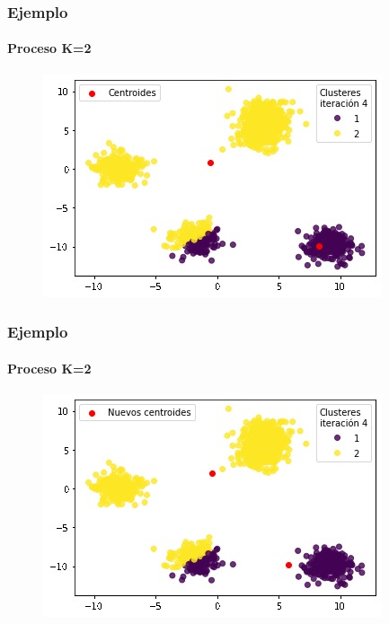 \documentclass[
  shownotes,
  xcolor={svgnames},
  hyperref={colorlinks,citecolor=DarkBlue,linkcolor=DarkRed,urlcolor=DarkBlue}
  , aspectratio=169]{beamer}
\begin{document}
\begin{frame}
\frametitle{Ejemplo}
\framesubtitle{Proceso K=2}


\begin{figure}[H] \centering

    \centering
    \includegraphics[scale=.7]{figures/k2_5.jpg}
  \\
  \tiny
\end{figure}


\end{frame}
\begin{frame}
\frametitle{Ejemplo}
\framesubtitle{Proceso K=2}


\begin{figure}[H] \centering

    \centering
    \includegraphics[scale=.7]{figures/k2_6.jpg}
  \\
  \tiny
\end{figure}


\end{frame}
\end{document}
